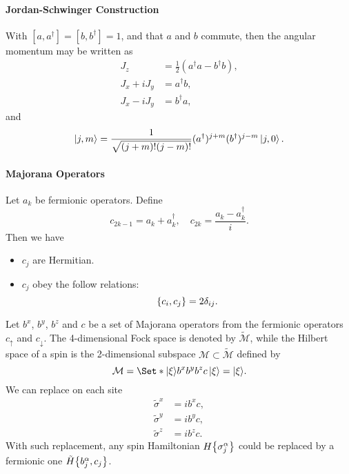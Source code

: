 \documentclass{article}
\begin{document}
\paragraph*{Jordan-Schwinger Construction}
With $[a,a^\dagger] = [b,b^\dagger] = 1$, and that $a$ and $b$ commute, then the angular momentum may be written as
\begin{align*}
    J_z &= \frac{1}{2}(a^\dagger a - b^\dagger b), \\
    J_x + i J_y &= a^\dagger b, \\
    J_x - i J_y &= b^\dagger a,
\end{align*}
and
\[ \ket{j,m} = \frac{1}{\sqrt{(j+m)! (j-m)!}}(a^\dagger)^{j+m} (b^\dagger)^{j-m}\ket{j,0}. \]

\paragraph*{Majorana Operators}
Let $a_k$ be fermionic operators.
Define
\[ c_{2k-1} = a_k + a_k^\dagger,\quad c_{2k} = \frac{a_k - a_k^\dagger}{i}. \]
Then we have
\begin{itemize}
    \item $c_j$ are Hermitian.
    \item $c_j$ obey the follow relations:
    \[ \qty{c_i,c_j} = 2\delta_{ij}. \]
\end{itemize}

Let $b^x$, $b^y$, $b^z$ and $c$ be a set of Majorana operators from the fermionic operators $c_\uparrow$ and $c_\downarrow$.
The 4-dimensional Fock space is denoted by $\tilde{\mathcal{M}}$, while the Hilbert space of a spin is the 2-dimensional subspace $\mathcal{M}\subset \tilde{\mathcal{M}}$ defined by
\[ \mathcal{M} = \Set*{\ket{\xi}}{b^x b^y b^z c\ket{\xi} = \ket{\xi}}. \]
We can replace on each site
\begin{align*}
    \tilde{\sigma}^x &= ib^x c, \\
    \tilde{\sigma}^y &= ib^y c, \\
    \tilde{\sigma}^z &= ib^z c.
\end{align*}
With such replacement, any spin Hamiltonian $H\qty{\sigma^\alpha_j}$ could be replaced by a fermionic one $\tilde{H}\qty{b^\alpha_j, c_j}$.

% 
% 
\end{document}
